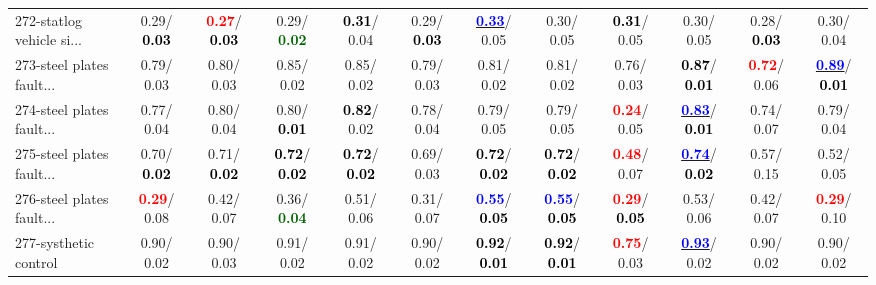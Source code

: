 \begin{table}[h]
\begin{center}
{\begin{tabular}{lc|c|c|c|c|c|c|c|c|c|c}
272-statlog vehicle si... &   0.29/\textcolor{black}{\textbf{  0.03}} & \textcolor{red}{\textbf{  0.27}}/\textcolor{black}{\textbf{  0.03}} &   0.29/\textcolor{darkgreen}{\textbf{  0.02}} & \textcolor{black}{\textbf{  0.31}}/  0.04 &   0.29/\textcolor{black}{\textbf{  0.03}} & \underline{\textcolor{blue}{\textbf{  0.33}}}/  0.05 &   0.30/  0.05 & \textcolor{black}{\textbf{  0.31}}/  0.05 &   0.30/  0.05 &   0.28/\textcolor{black}{\textbf{  0.03}} &   0.30/  0.04 \\
273-steel plates fault... &   0.79/  0.03 &   0.80/  0.03 &   0.85/  0.02 &   0.85/  0.02 &   0.79/  0.03 &   0.81/  0.02 &   0.81/  0.02 &   0.76/  0.03 & \textcolor{black}{\textbf{  0.87}}/\textcolor{black}{\textbf{  0.01}} & \textcolor{red}{\textbf{  0.72}}/  0.06 & \underline{\textcolor{blue}{\textbf{  0.89}}}/\textcolor{black}{\textbf{  0.01}} \\
274-steel plates fault... &   0.77/  0.04 &   0.80/  0.04 &   0.80/\textcolor{black}{\textbf{  0.01}} & \textcolor{black}{\textbf{  0.82}}/  0.02 &   0.78/  0.04 &   0.79/  0.05 &   0.79/  0.05 & \textcolor{red}{\textbf{  0.24}}/  0.05 & \underline{\textcolor{blue}{\textbf{  0.83}}}/\textcolor{black}{\textbf{  0.01}} &   0.74/  0.07 &   0.79/  0.04 \\
275-steel plates fault... &   0.70/\textcolor{black}{\textbf{  0.02}} &   0.71/\textcolor{black}{\textbf{  0.02}} & \textcolor{black}{\textbf{  0.72}}/\textcolor{black}{\textbf{  0.02}} & \textcolor{black}{\textbf{  0.72}}/\textcolor{black}{\textbf{  0.02}} &   0.69/  0.03 & \textcolor{black}{\textbf{  0.72}}/\textcolor{black}{\textbf{  0.02}} & \textcolor{black}{\textbf{  0.72}}/\textcolor{black}{\textbf{  0.02}} & \textcolor{red}{\textbf{  0.48}}/  0.07 & \underline{\textcolor{blue}{\textbf{  0.74}}}/\textcolor{black}{\textbf{  0.02}} &   0.57/  0.15 &   0.52/  0.05 \\
276-steel plates fault... & \textcolor{red}{\textbf{  0.29}}/  0.08 &   0.42/  0.07 &   0.36/\textcolor{darkgreen}{\textbf{  0.04}} &   0.51/  0.06 &   0.31/  0.07 & \textcolor{blue}{\textbf{  0.55}}/\textcolor{black}{\textbf{  0.05}} & \textcolor{blue}{\textbf{  0.55}}/\textcolor{black}{\textbf{  0.05}} & \textcolor{red}{\textbf{  0.29}}/\textcolor{black}{\textbf{  0.05}} &   0.53/  0.06 &   0.42/  0.07 & \textcolor{red}{\textbf{  0.29}}/  0.10 \\
277-systhetic control &   0.90/  0.02 &   0.90/  0.03 &   0.91/  0.02 &   0.91/  0.02 &   0.90/  0.02 & \textcolor{black}{\textbf{  0.92}}/\textcolor{black}{\textbf{  0.01}} & \textcolor{black}{\textbf{  0.92}}/\textcolor{black}{\textbf{  0.01}} & \textcolor{red}{\textbf{  0.75}}/  0.03 & \underline{\textcolor{blue}{\textbf{  0.93}}}/  0.02 &   0.90/  0.02 &   0.90/  0.02 \\ \hline

\end{tabular}}
\end{center}
\end{table}
